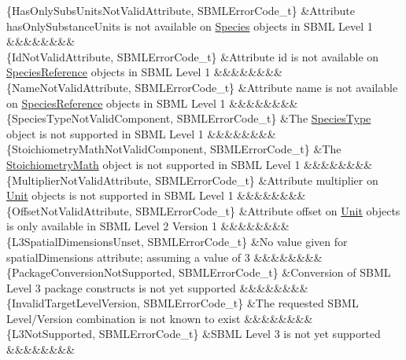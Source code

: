 \begin{DoxyParagraph}{}
\begin{longtabu}
\{Has\+Only\+Subs\+Units\+Not\+Valid\+Attribute, S\+B\+M\+L\+Error\+Code\+\_\+t\} &Attribute \textquotesingle{}has\+Only\+Substance\+Units\textquotesingle{} is not available on \hyperlink{class_species}{Species} objects in S\+B\+ML Level 1 &&&&&&&&\\
\{Id\+Not\+Valid\+Attribute, S\+B\+M\+L\+Error\+Code\+\_\+t\} &Attribute \textquotesingle{}id\textquotesingle{} is not available on \hyperlink{class_species_reference}{Species\+Reference} objects in S\+B\+ML Level 1 &&&&&&&&\\
\{Name\+Not\+Valid\+Attribute, S\+B\+M\+L\+Error\+Code\+\_\+t\} &Attribute \textquotesingle{}name\textquotesingle{} is not available on \hyperlink{class_species_reference}{Species\+Reference} objects in S\+B\+ML Level 1 &&&&&&&&\\
\{Species\+Type\+Not\+Valid\+Component, S\+B\+M\+L\+Error\+Code\+\_\+t\} &The \hyperlink{class_species_type}{Species\+Type} object is not supported in S\+B\+ML Level 1 &&&&&&&&\\
\{Stoichiometry\+Math\+Not\+Valid\+Component, S\+B\+M\+L\+Error\+Code\+\_\+t\} &The \hyperlink{class_stoichiometry_math}{Stoichiometry\+Math} object is not supported in S\+B\+ML Level 1 &&&&&&&&\\
\{Multiplier\+Not\+Valid\+Attribute, S\+B\+M\+L\+Error\+Code\+\_\+t\} &Attribute \textquotesingle{}multiplier\textquotesingle{} on \hyperlink{class_unit}{Unit} objects is not supported in S\+B\+ML Level 1 &&&&&&&&\\
\{Offset\+Not\+Valid\+Attribute, S\+B\+M\+L\+Error\+Code\+\_\+t\} &Attribute \textquotesingle{}offset\textquotesingle{} on \hyperlink{class_unit}{Unit} objects is only available in S\+B\+ML Level 2 Version 1 &&&&&&&&\\
\{L3\+Spatial\+Dimensions\+Unset, S\+B\+M\+L\+Error\+Code\+\_\+t\} &No value given for \textquotesingle{}spatial\+Dimensions\textquotesingle{} attribute; assuming a value of 3 &&&&&&&&\\
\{Package\+Conversion\+Not\+Supported, S\+B\+M\+L\+Error\+Code\+\_\+t\} &Conversion of S\+B\+ML Level 3 package constructs is not yet supported &&&&&&&&\\
\{Invalid\+Target\+Level\+Version, S\+B\+M\+L\+Error\+Code\+\_\+t\} &The requested S\+B\+ML Level/\+Version combination is not known to exist &&&&&&&&\\
\{L3\+Not\+Supported, S\+B\+M\+L\+Error\+Code\+\_\+t\} &S\+B\+ML Level 3 is not yet supported &&&&&&&&\\

\end{longtabu}
\end{DoxyParagraph}

